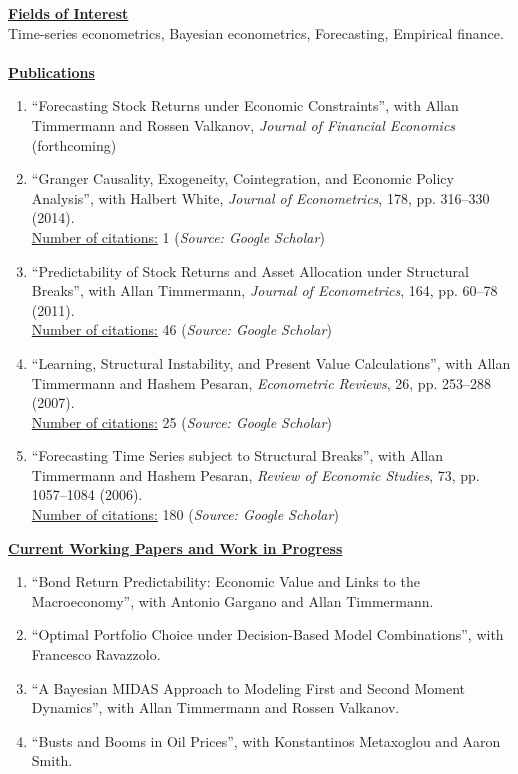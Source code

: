 \documentclass[12pt]{article}
\begin{document}
\underline{\textbf{Fields of Interest}}\\
Time-series econometrics, Bayesian econometrics, Forecasting, Empirical finance.\\ \\
\underline{\textbf{Publications}}
\begin{enumerate}	
	\item ``Forecasting Stock Returns under Economic Constraints'', with Allan Timmermann and Rossen Valkanov, \emph{Journal of Financial Economics} (forthcoming)
	
	\item ``Granger Causality, Exogeneity, Cointegration, and Economic Policy Analysis'', with Halbert White, \emph{Journal of Econometrics}, 178, pp. 316--330 (2014). \\
	\underline{Number of citations:} 1 (\emph{Source: Google Scholar})
	
	\item ``Predictability of Stock Returns and Asset Allocation under Structural Breaks'', with Allan Timmermann, \emph{Journal of Econometrics}, 164, pp. 60--78 (2011). \\
	\underline{Number of citations:} 46 (\emph{Source: Google Scholar})
	
	\item ``Learning, Structural Instability, and Present Value Calculations'', with Allan Timmermann and Hashem Pesaran, \emph{Econometric Reviews}, 26, pp. 253--288 (2007). \\
	\underline{Number of citations:} 25 (\emph{Source: Google Scholar})

	\item ``Forecasting Time Series subject to Structural Breaks'', with Allan Timmermann and Hashem Pesaran, \emph{Review of Economic Studies}, 73, pp. 1057--1084 (2006). \\
	\underline{Number of citations:} 180 (\emph{Source: Google Scholar})

    \setcounter{enumTemp}{\theenumi}
 \end{enumerate}
\underline{\textbf{Current Working Papers and Work in Progress}}
\begin{enumerate}
	\setcounter{enumi}{\theenumTemp}
	\item ``Bond Return Predictability: Economic Value and Links to the Macroeconomy'', with Antonio Gargano and Allan Timmermann.
	\item ``Optimal Portfolio Choice under Decision-Based Model Combinations'', with Francesco Ravazzolo.
	\item ``A Bayesian MIDAS Approach to Modeling First and Second Moment Dynamics'', with Allan Timmermann and Rossen Valkanov.
	\item ``Busts and Booms in Oil Prices'', with Konstantinos Metaxoglou  and Aaron Smith.
\end{enumerate}
\end{document}
